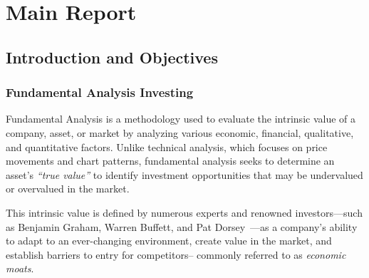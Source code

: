 \documentclass[11pt,english,a4paper,hidelinks]{book}
\begin{document}
\tableofcontents
\newpage

\listoffigures
\newpage

\listoftables


\printglossary[type=\acronymtype, title=Acronyms]

\clearpage
{}
\setcounter{page}{1}

\part{Main Report}

\chapter{Introduction and Objectives }
\section{Fundamental Analysis Investing}

\noindent Fundamental Analysis is a methodology used to evaluate the intrinsic value of a company, asset, or market by analyzing various economic, financial, qualitative, and quantitative factors. Unlike technical analysis, which focuses on price movements and chart patterns, fundamental analysis seeks to determine an asset's \textit{``true value''} to identify investment opportunities that may be undervalued or overvalued in the market.

\vspace{0.5cm}
\noindent This intrinsic value is defined by numerous experts and renowned investors—such as Benjamin Graham, Warren Buffett, and Pat Dorsey~\cite{dorsey2011five}—as a company's ability to adapt to an ever-changing environment, create value in the market, and establish barriers to entry for competitors-- commonly referred to as \textit{economic moats}.
\end{document}
